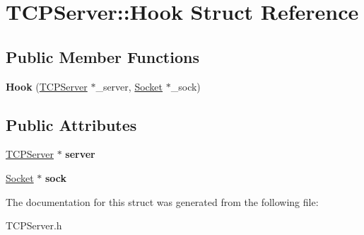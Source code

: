 \hypertarget{structTCPServer_1_1Hook}{\section{T\-C\-P\-Server\-:\-:Hook Struct Reference}
\label{structTCPServer_1_1Hook}
}
\subsection*{Public Member Functions}
\begin{DoxyCompactItemize}
\item 
\hypertarget{structTCPServer_1_1Hook_ab7d1f34003d7e1351802b78d70513b69}{{\bfseries Hook} (\hyperlink{classTCPServer}{T\-C\-P\-Server} $\ast$\-\_\-server, \hyperlink{classSocket}{Socket} $\ast$\-\_\-sock)}\label{structTCPServer_1_1Hook_ab7d1f34003d7e1351802b78d70513b69}

\end{DoxyCompactItemize}
\subsection*{Public Attributes}
\begin{DoxyCompactItemize}
\item 
\hypertarget{structTCPServer_1_1Hook_a05a2a91ba8cd71e45a702160842f9025}{\hyperlink{classTCPServer}{T\-C\-P\-Server} $\ast$ {\bfseries server}}\label{structTCPServer_1_1Hook_a05a2a91ba8cd71e45a702160842f9025}

\item 
\hypertarget{structTCPServer_1_1Hook_a511a47e58128074e7aa9992371fbdd1e}{\hyperlink{classSocket}{Socket} $\ast$ {\bfseries sock}}\label{structTCPServer_1_1Hook_a511a47e58128074e7aa9992371fbdd1e}

\end{DoxyCompactItemize}


The documentation for this struct was generated from the following file\-:\begin{DoxyCompactItemize}
\item 
T\-C\-P\-Server.\-h\end{DoxyCompactItemize}
